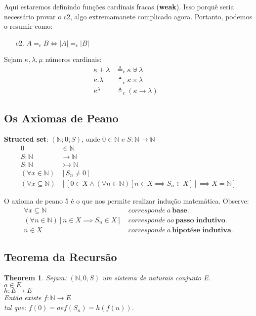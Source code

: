 \documentclass[12pt, a4paper]{article}
\newtheorem*{theorem}{Theorem}
\begin{document}
Aqui estaremos definindo funções cardinais fracas (\textbf{weak}). Isso porquê seria necessário provar o c2, algo extremamanete complicado agora. Portanto, podemos o resumir como:\\

\begin{itemize}
\item[c2.] $A =_c B \iff |A| =_c |B|$
\end{itemize}

Sejam $\kappa, \lambda, \mu$ números cardinais:
\begin{align*}
\kappa + \lambda &\triangleq_c \kappa \uplus \lambda & \\
\kappa . \lambda &\triangleq_c \kappa \times \lambda & \\
\kappa^\lambda &\triangleq_c (\kappa \to \lambda) &
\end{align*}

\subsection{Os Axiomas de Peano}
\textbf{Structed set}: $(\mathbb{N}; 0; S)$, onde $0 \in \mathbb{N}$ e $S:\mathbb{N} \rightarrow \mathbb{N}$\\

\begin{align*}
0 &\in \mathbb{N}\\
S: \mathbb{N} &\rightarrow \mathbb{N}\\
S: \mathbb{N} &\rightarrowtail \mathbb{N}\\
(\forall x \in \mathbb{N})&[S_n \neq 0 ]\\
(\forall x \subseteq \mathbb{N})&[ [0 \in X \land (\forall n \in \mathbb{N}) [n \in X \implies S_n \in X ]] \implies X = \mathbb{N}]
\end{align*}

O axioma de peano 5 é o que nos permite realizar indução matemática. Observe:
\begin{align*}
\forall x \subseteq \mathbb{N}~&corresponde~a~\textbf{base}.\\
(\forall n \in \mathbb{N}) [n \in X \implies S_n \in X] ~&corresponde~ao~\textbf{passo indutivo}.\\
n \in X ~&corresponde~a~\textbf{hipotése indutiva}.
\end{align*}

\subsection{Teorema da Recursão}
\label{sec:recursion}
\begin{theorem}
Sejam: $(\mathbb{N}, 0, S)$ um sistema de naturais conjunto E.\\
$a \in E$\\
$h:E \rightarrow E$\\
Então existe $f: \mathbb{N} \rightarrow E$\\
tal que: $f(0) = a e f(S_n) = h(f(n))$.
\end{theorem}
\end{document}
